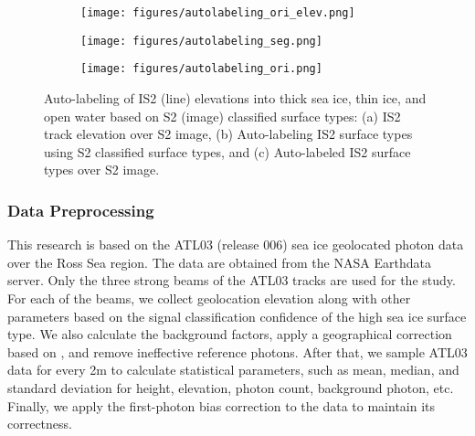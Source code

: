 \begin{figure}[htb]
\begin{framed}
        \centering
        \begin{subfigure}[b]{0.32\textwidth} 
            \centering
            \texttt{[image: figures/autolabeling\_ori\_elev.png]}
            \caption{}%
            \label{fig:autolabeling_ori_elev}
        \end{subfigure}
        \begin{subfigure}[b]{0.32\textwidth}
            \centering
            \texttt{[image: figures/autolabeling\_seg.png]}
            \caption{}%
            \label{fig:autolabeling_seg}
        \end{subfigure}
        \begin{subfigure}[b]{0.32\textwidth}
            \centering
            \texttt{[image: figures/autolabeling\_ori.png]}
            \caption{}%
            \label{fig:autolabeling_ori}
        \end{subfigure}
    \end{framed}
    \caption{Auto-labeling of IS2 (line) elevations into thick sea ice, thin ice, and open water based on S2 (image) classified surface types: (a) IS2 track elevation over S2 image, (b) Auto-labeling IS2 surface types using S2 classified surface types, and (c) Auto-labeled IS2 surface types over S2 image.}
    \label{fig:autolabeling}
\end{figure}

\subsubsection{Data Preprocessing}
This research is based on the ATL03 (release 006) sea ice geolocated photon data over the Ross Sea region. The data are obtained from the NASA Earthdata server. Only the three strong beams of the ATL03 tracks are used for the study. For each of the beams, we collect geolocation elevation along with other parameters based on the signal classification confidence of the high sea ice surface type. We also calculate the background factors, apply a geographical correction based on \cite{neumann2021icesat}, and remove ineffective reference photons. After that, we sample ATL03 data for every 2m to calculate statistical parameters, such as mean, median, and standard deviation for height, elevation, photon count, background photon, etc. Finally, we apply the first-photon bias correction to the data to maintain its correctness.
